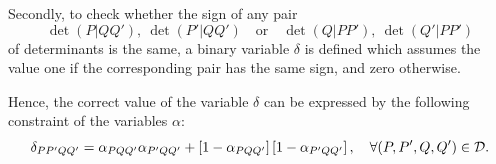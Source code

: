 \documentclass[a4paper,  review, authoryear, 1p.]{elsarticle}
\newcommand{\VB}{{V^{}_{\mathcal B}}}
\newcommand{\CV}[1]{{\color{blue}#1}}
\newcommand{\determinant}[3]{\det({#1|#2#3})}
\begin{document}
	Secondly, to check whether the sign of any pair
	\begin{equation}\label{eq:pair}
		\determinant{P}{Q}{Q'},\: \determinant{P'}{Q}{Q'}\quad \text{or} \quad \determinant{Q}{P}{P'},\:	 \determinant{Q'}{P}{P'}
	\end{equation} 
	of determinants is the same, a binary variable $\delta$ is defined which assumes the value one if the corresponding pair has the same sign, and zero otherwise.
	
	\newcommand{\varepsilonprod}[4]{\varepsilon_{#1#2#3#4}}
	
	Hence, the correct value of the variable $\delta$ can be expressed by the following constraint of the variables $\alpha$:
	\begin{equation*}%
		\deltamas{P}{P'}{Q}{Q'}=\alphamas{P}{Q}{Q'}\alphamas{P'}{Q}{Q'} + \left[1-\alphamas{P}{Q}{Q'}\right]\left[1-\alphamas{P'}{Q}{Q'}\right],\quad\forall (P,P',Q,Q')\in\mathcal D.
	\end{equation*}
	
\end{document}

